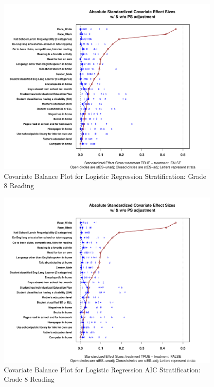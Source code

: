 \begin{figure}[h!]
\begin{center}
\includegraphics[width=\textwidth]{../Figures2009/g8read-lr-balance.pdf}
\caption{Covariate Balance Plot for Logistic Regression Stratification: Grade 8 Reading}
\end{center}
\end{figure}

\begin{figure}
\begin{center}
\includegraphics[width=\textwidth]{../Figures2009/g8read-lrAIC-balance.pdf}
\caption{Covariate Balance Plot for Logistic Regression AIC Stratification: Grade 8 Reading}
\end{center}
\end{figure}

